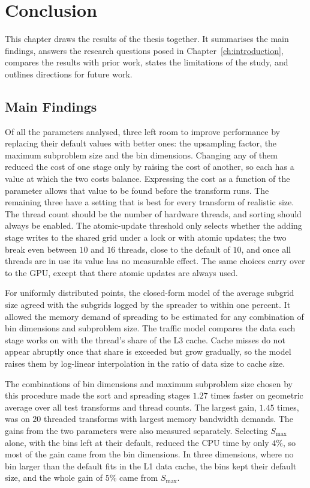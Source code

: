 \chapter{Conclusion}
\label{ch:conclusion}

This chapter draws the results of the thesis together. It summarises the main
findings, answers the research questions posed in
Chapter~\ref{ch:introduction}, compares the results with prior work,
states the limitations of the study, and outlines directions for future work.

\section{Main Findings}
\label{sec:main_findings}


Of all the parameters analysed, three left room to improve performance by replacing their default values with better ones: the upsampling factor, the maximum subproblem size and the bin dimensions. Changing any of them reduced the cost of one stage only by raising the cost of another, so each has a value at which the two costs balance. Expressing the cost as a function of the parameter allows that value to be found before the transform runs. The remaining three have a setting that is best for every transform of realistic size. The thread count should be the number of hardware threads, and sorting should always be enabled. The atomic-update threshold only selects whether the adding stage writes to the shared grid under a lock or with atomic updates; the two break even between $10$ and $16$ threads, close to the default of $10$, and once all threads are in use its value has no measurable effect. The same choices carry over to the GPU, except that there atomic updates are always used.

For uniformly distributed points, the closed-form model of the average subgrid
size agreed with the subgrids logged by the spreader to within one percent. It
allowed the memory demand of spreading to be estimated for any combination of
bin dimensions and subproblem size. The traffic model compares the data each
stage works on with the thread's share of the L3 cache. Cache misses do not
appear abruptly once that share is exceeded but grow gradually, so the model
raises them by log-linear interpolation in the ratio of data size to cache
size.

The combinations of bin dimensions and maximum subproblem size chosen by this
procedure made the sort and spreading stages $1.27$ times faster on geometric
average over all test transforms and thread counts. The largest gain, $1.45$
times, was on $20$ threaded transforms with largest memory bandwidth demands. The
gains from the two parameters were also measured separately. Selecting $S_{\max}$
alone, with the bins left at their default, reduced the CPU time by only $4\%$,
so most of the gain came from the bin dimensions. In three dimensions, where no
bin larger than the default fits in the L1 data cache, the bins kept their
default size, and the whole gain of $5\%$ came from $S_{\max}$.

